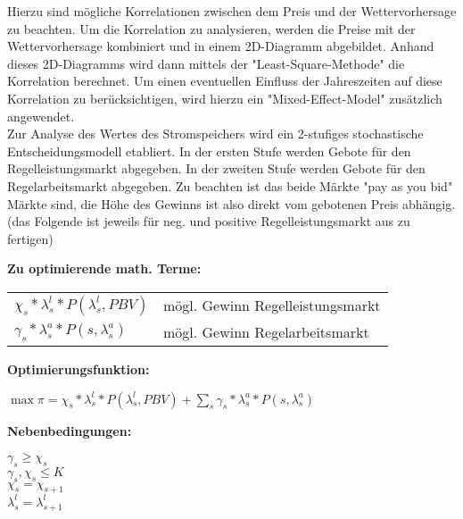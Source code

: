 \documentclass[british,         %
BCOR=2mm,                       %
11pt,                           %
a4paper,						%
oneside,						%
cdgeometry,                     %
toc=chapterentrydotfill,        %
toc=indent,                     %
bibliography=totoc,         	%
listof=totoc,                   %
numbers=noenddot,				%
parskip=full,                   %
cdmath=false					%
]{article}                  %
\begin{document}
Hierzu sind mögliche Korrelationen zwischen dem Preis und der Wettervorhersage zu beachten.
Um die Korrelation zu analysieren, werden die Preise mit 
der Wettervorhersage kombiniert und in einem 2D-Diagramm abgebildet. Anhand dieses 2D-Diagramms wird
dann mittels der "Least-Square-Methode" die Korrelation berechnet. Um einen eventuellen Einfluss der Jahreszeiten 
auf diese Korrelation zu berücksichtigen, wird hierzu ein "Mixed-Effect-Model" zusätzlich angewendet.\\

Zur Analyse des Wertes des Stromspeichers wird ein 2-stufiges stochastische Entscheidungsmodell etabliert. 
In der ersten Stufe werden Gebote für den Regelleistungsmarkt abgegeben. In der zweiten Stufe werden Gebote für den Regelarbeitsmarkt
abgegeben. Zu beachten ist das beide Märkte "pay as you bid" Märkte sind, die Höhe des Gewinns ist also direkt vom 
gebotenen Preis abhängig.\\


(das Folgende ist jeweils für neg. und positive Regelleistungsmarkt aus zu fertigen)


\begin{flushleft}\textbf{Zu optimierende math. Terme:}\end{flushleft}
\begin{tabular}{l l}
	$\chi_s * \lambda_s^l * P(\lambda_s^l, PBV)$& 		mögl. Gewinn Regelleistungsmarkt\\
	$\gamma_s * \lambda_s^a * P(s,\lambda_s^a)$&		mögl. Gewinn Regelarbeitsmarkt\\
\end{tabular}



\begin{flushleft}\textbf{Optimierungsfunktion:}\\\end{flushleft}
\begin{addmargin}[25pt]{0pt}
$\max \pi = \chi_s * \lambda_s^l * P(\lambda_s^l, PBV) + \sum_{s} \gamma_s * \lambda_s^a *P(s,\lambda_s^a)$\\
\end{addmargin}

\begin{flushleft}\textbf{Nebenbedingungen:}\end{flushleft}
\begin{addmargin}[25pt]{0pt}
	$ \gamma_s \geq \chi_s$ \\%
	$ \gamma_s, \chi_s \leq K$\\ %
	$\chi_s = \chi_{s+1}$\\
	$\lambda_s^l = \lambda_{s+1}^l $ \\
\end{addmargin}
\end{document}

